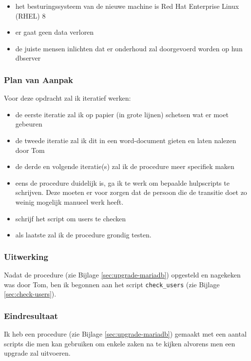 \begin{itemize}
    \item het besturingssysteem van de nieuwe machine is Red Hat Enterprise Linux (RHEL) 8
    \item er gaat geen data verloren
    \item de juiste mensen inlichten dat er onderhoud zal doorgevoerd worden op hun dbserver
\end{itemize}

\subsubsection{Plan van Aanpak}

Voor deze opdracht zal ik iteratief werken:

\begin{itemize}
    \item de eerste iteratie zal ik op papier (in grote lijnen) schetsen wat er moet gebeuren
    \item de tweede iteratie zal ik dit in een word-document gieten en laten nalezen door Tom
    \item de derde en volgende iteratie(s) zal ik de procedure meer specifiek maken
    \item eens de procedure duidelijk is, ga ik te werk om bepaalde hulpscripts te schrijven. Deze moeten er voor zorgen dat de persoon die de transitie doet zo weinig mogelijk manueel werk heeft.
    \item schrijf het script om users te checken
    \item als laatste zal ik de procedure grondig testen.
\end{itemize}

\subsubsection{Uitwerking}

Nadat de procedure (zie Bijlage \ref{sec:upgrade-mariadb}) opgesteld en nagekeken was door Tom, ben ik begonnen aan het script \verb*|check_users| (zie Bijlage \ref{sec:check-users}).

\subsubsection{Eindresultaat}

Ik heb een procedure (zie Bijlage \ref{sec:upgrade-mariadb}) gemaakt met een aantal scripts die men kan gebruiken om enkele zaken na te kijken alvorens men een upgrade zal uitvoeren.


